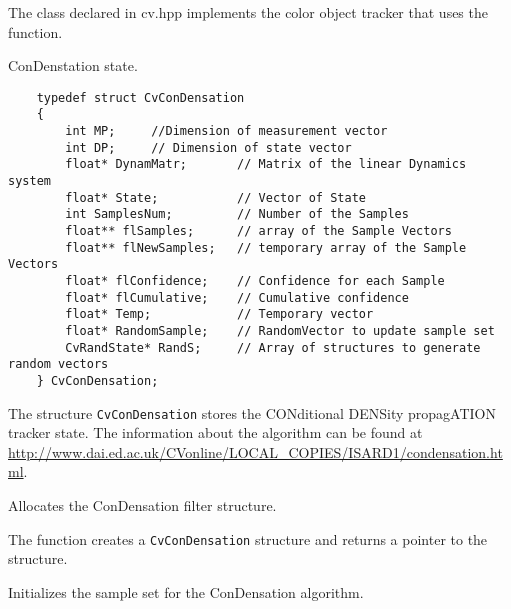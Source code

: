The  class declared in cv.hpp implements the color object tracker that uses the function.

ConDenstation state.

\begin{lstlisting}
    typedef struct CvConDensation
    {
        int MP;     //Dimension of measurement vector
        int DP;     // Dimension of state vector
        float* DynamMatr;       // Matrix of the linear Dynamics system
        float* State;           // Vector of State
        int SamplesNum;         // Number of the Samples
        float** flSamples;      // array of the Sample Vectors
        float** flNewSamples;   // temporary array of the Sample Vectors
        float* flConfidence;    // Confidence for each Sample
        float* flCumulative;    // Cumulative confidence
        float* Temp;            // Temporary vector
        float* RandomSample;    // RandomVector to update sample set
        CvRandState* RandS;     // Array of structures to generate random vectors
    } CvConDensation;

\end{lstlisting}
The structure \texttt{CvConDensation} stores the CONditional DENSity propagATION tracker state. The information about the algorithm can be found at \url{http://www.dai.ed.ac.uk/CVonline/LOCAL\_COPIES/ISARD1/condensation.html}.

Allocates the ConDensation filter structure.


\begin{description}
\end{description}

The function creates a \texttt{CvConDensation} structure and returns a pointer to the structure.

Initializes the sample set for the ConDensation algorithm.


